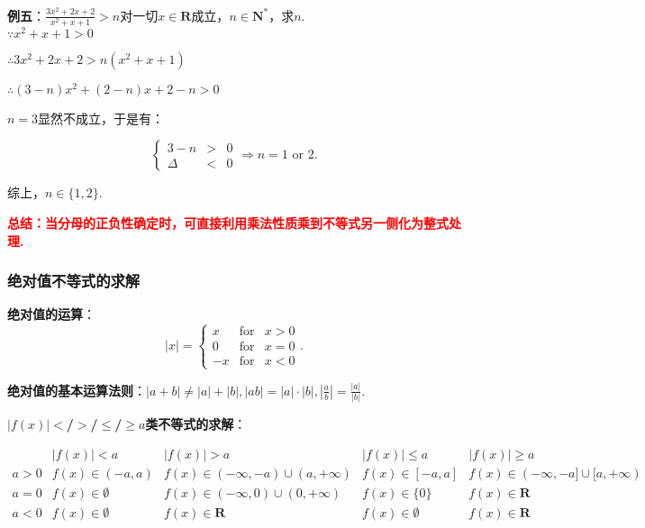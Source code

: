 \documentclass[8pt]{article}
\begin{document}
				~\\

				\textbf{例五}：$\displaystyle \frac{3x^2+2x+2}{x^2+x+1}>n$对一切$x\in\mathbf{R}$成立，$n\in\mathbf{N}^{*}$，求$n$.
					~\\

					$\because x^2+x+1 >0$

					$\therefore 3x^2+2x+2>n(x^2+x+1)$

					$\therefore (3-n)x^2+(2-n)x+2-n>0$

					$n=3$显然不成立，于是有：

					$$
					\left\{
					\begin{array}{rcl}
					3-n&>&0\\
					\Delta&<&0
					\end{array}
					\right.
					\Rightarrow
					n=1\text{ or }2.
					$$

					综上，$n\in\{1,2\}.$

					\textcolor{red}{\textbf{总结：当分母的正负性确定时，可直接利用乘法性质乘到不等式另一侧化为整式处理.}}

			\subsubsection{绝对值不等式的求解}
				\textbf{绝对值的运算}：
				$$
				|x|=\left\{
				\begin{array}{rcl}
				x&\text{for}&x>0\\
				0&\text{for}&x=0\\
				-x&\text{for}&x<0
				\end{array}
				\right..
				$$

				\textbf{绝对值的基本运算法则}：$\displaystyle|a+b|\neq|a|+|b|, |ab|=|a|\cdot|b|, \left|\frac{a}{b}\right|=\frac{|a|}{|b|}.$

				\textbf{$|f(x)|$$<$/$>$/$\leq$/$\geq$$a$类不等式的求解}：

				$$
				\begin{array}{ccccc}
					   &|f(x)|<a&|f(x)|>a&|f(x)|\leq a&|f(x)|\geq a\\
				    a>0&f(x)\in(-a, a)&f(x)\in(-\infty, -a)\cup(a, +\infty)&f(x)\in[-a, a]&f(x)\in(-\infty, -a]\cup[a, +\infty)\\
				    a=0&f(x)\in\emptyset&f(x)\in(-\infty, 0)\cup(0, +\infty)&f(x)\in\{0\}&f(x)\in\mathbf{R}\\
				    a<0&f(x)\in\emptyset&f(x)\in\mathbf{R}&f(x)\in\emptyset&f(x)\in\mathbf{R}\\
				\end{array}
				$$
\end{document}
